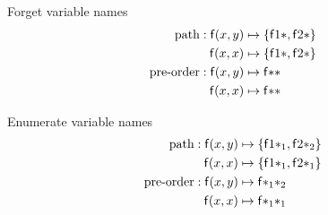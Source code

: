 

	
	\begin{exampleblock}{Forget variable names}
		\vspace{-1em}
	\begin{align*}
		\text{path}: {\mathsf f}(x,y)  &\mapsto \{ {\mathsf f} 1 {*}, {\mathsf f} 2 {*} \}\\
			{\mathsf f}(x,x)  &\mapsto \{ {\mathsf f} 1 {*}, {\mathsf f} 2 {*} \}\\
		\text{pre-order}:
		{\mathsf f}(x,y) &\mapsto {\mathsf f} {*} {*} \\
		{\mathsf f}(x,x) &\mapsto {\mathsf f} {*} {*}
			\end{align*}
			\end{exampleblock}
%	

\begin{exampleblock}{Enumerate variable names}
	\vspace{-1em}	
	\begin{align*}
		\text{path}: {\mathsf f}(x,y)  &\mapsto \{ {\mathsf f} 1 {*_1}, {\mathsf f} 2 {*_2} \}\\
		{\mathsf f}(x,x)  &\mapsto \{ {\mathsf f} 1 {*_1}, {\mathsf f} 2 {*_1} \}\\
		\text{pre-order}:
		{\mathsf f}(x,y) &\mapsto {\mathsf f} {*_1} {*_2} \\
		{\mathsf f}(x,x) &\mapsto {\mathsf f} {*_1} {*_1}
	\end{align*}
	\end{exampleblock}